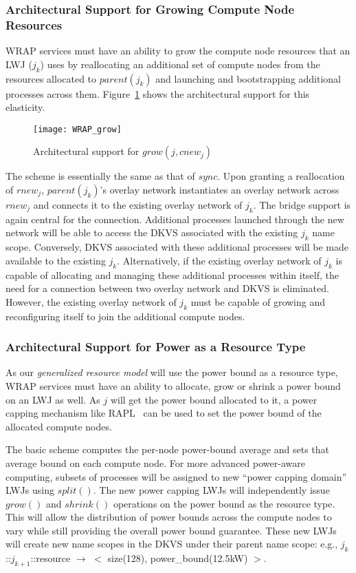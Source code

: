 \subsubsection{Architectural Support for Growing Compute Node Resources}
WRAP services must have an ability to grow the compute node resources that an LWJ ($j_k$)
uses by reallocating an additional set of compute nodes from the resources allocated
to $parent(j_k)$ and launching and bootstrapping additional processes
across them.
Figure~\ref{fig:ext2} shows the architectural support for this elasticity. 
\begin{figure}
  \centering
    \texttt{[image: WRAP\_grow]}
  \caption{Architectural support for ${grow(j, cnew_j)}$}
  \label{fig:ext2}
\end{figure}
The scheme is essentially the same as that of $sync$.
Upon granting a reallocation of $rnew_j$,
$parent(j_k)$'s overlay network instantiates an overlay network
across $rnew_j$ and connects it to the existing overlay network
of $j_k$. The bridge support is again central for the connection.
Additional processes launched through the new network will
be able to access the DKVS associated with the existing $j_k$
name scope. Conversely, DKVS associated with these additional
processes will be made available to the existing $j_k$.
Alternatively, if the existing overlay network of $j_k$ is
capable of allocating and managing these additional processes
within itself, the need for a connection between two overlay
network and DKVS is eliminated. However, the existing overlay network
of $j_k$ must be capable of growing and
reconfiguring itself to join the additional compute nodes.

\subsubsection{Architectural Support for Power as a Resource Type}
As our {\em generalized resource model} will use the power bound as
a resource type, WRAP services must have an ability to allocate, grow
or shrink a power bound on an LWJ as well. 
As $j$ will get the power bound allocated to it, 
a power capping mechanism like RAPL~\cite{RountreeRAPL} can be used
to set the power bound of the allocated compute nodes.

The basic scheme computes the per-node power-bound average
and sets that average bound on each compute node.
For more advanced power-aware computing, subsets of processes will
be assigned to new ``power capping domain'' LWJs using $split()$.
The new power capping LWJs will independently issue $grow()$ and $shrink()$
operations on the power bound as the resource type.
This will allow the distribution of power bounds across the compute
nodes to vary while still providing the overall power bound guarantee.
These new LWJs will create new name scopes
in the DKVS under their parent name scope:
e.g., $j_k$::$j_{k+1}$::resource $\rightarrow$ $<$ size(128), power\_bound(12.5kW) $>$.

